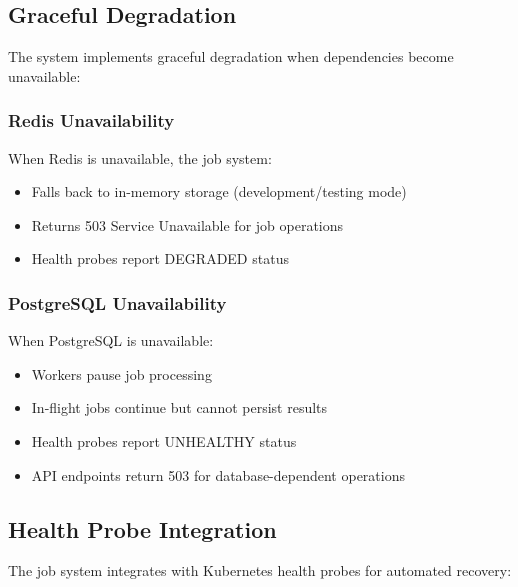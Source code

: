 \subsection{Graceful Degradation}

The system implements graceful degradation when dependencies become unavailable:

\subsubsection{Redis Unavailability}

When Redis is unavailable, the job system:
\begin{itemize}
    \item Falls back to in-memory storage (development/testing mode)
    \item Returns 503 Service Unavailable for job operations
    \item Health probes report DEGRADED status
\end{itemize}

\subsubsection{PostgreSQL Unavailability}

When PostgreSQL is unavailable:
\begin{itemize}
    \item Workers pause job processing
    \item In-flight jobs continue but cannot persist results
    \item Health probes report UNHEALTHY status
    \item API endpoints return 503 for database-dependent operations
\end{itemize}

\subsection{Health Probe Integration}

The job system integrates with Kubernetes health probes for automated recovery:


